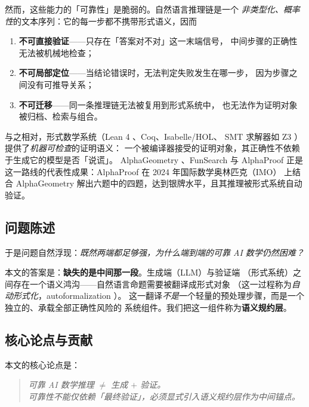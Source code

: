 \documentclass[UTF8,a4paper,11pt]{ctexart}
\begin{document}
然而，这些能力的「可靠性」是脆弱的。自然语言推理链是一个
\emph{非类型化、概率性}的文本序列：它的每一步都不携带形式语义，因而
\begin{enumerate}[leftmargin=1.6em,itemsep=2pt]
  \item \textbf{不可直接验证}——只存在「答案对不对」这一末端信号，
        中间步骤的正确性无法被机械地检查；
  \item \textbf{不可局部定位}——当结论错误时，无法判定失败发生在哪一步，
        因为步骤之间没有可推导关系；
  \item \textbf{不可迁移}——同一条推理链无法被复用到形式系统中，
        也无法作为证明对象被归档、检索与组合。
\end{enumerate}

与之相对，形式数学系统（Lean 4 \citep{demoura2021lean4}、Coq、Isabelle/HOL、
SMT 求解器如 Z3 \citep{demoura2008z3}）提供了\emph{机器可检查}的证明语义：
一个被编译器接受的证明对象，其正确性不依赖于生成它的模型是否「说谎」。
AlphaGeometry \citep{trinh2024alphageometry}、FunSearch
\citep{romera2024funsearch} 与 AlphaProof \citep{hubert2025alphaproof}
正是这一路线的代表性成果：AlphaProof 在 2024 年国际数学奥林匹克（IMO）
上结合 AlphaGeometry 解出六题中的四题，达到银牌水平，且其推理被形式系统自动
验证。

\subsection{问题陈述}

于是问题自然浮现：\emph{既然两端都足够强，为什么端到端的可靠 AI 数学仍然困难？}

本文的答案是：\textbf{缺失的是中间那一段}。生成端（LLM）与验证端
（形式系统）之间存在一个语义鸿沟——自然语言命题需要被翻译成形式对象
（这一过程称为\emph{自动形式化}，autoformalization \citep{wu2022autoformalization}）。
这一翻译\emph{不是}一个轻量的预处理步骤，而是一个独立的、承载全部正确性风险的
系统组件。我们把这一组件称为\textbf{语义规约层}。

\subsection{核心论点与贡献}

本文的核心论点是：

\begin{quote}
\itshape
可靠 AI 数学推理 $\neq$ 生成 $+$ 验证。\\
可靠性不能仅依赖「最终验证」，必须显式引入\emph{语义规约层}作为中间锚点。
\end{quote}
\end{document}
